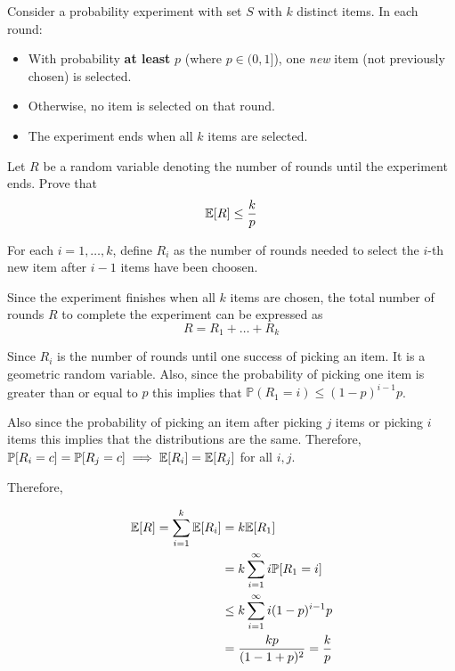 \documentclass[12pt, letterpaper]{article}
\renewcommand{\P}{\mathbb{P}}
\begin{document}
\begin{subproblem}{}
  Consider a probability experiment with set $S$ with $k$ distinct items. In each round: 
  \begin{itemize}
      \item With probability \textbf{at least} $p$ (where $p \in (0,1]$), one \emph{new} item (not previously chosen) is selected. 
      \item Otherwise, no item is selected on that round. 
      \item The experiment ends when all $k$ items are selected. 
  \end{itemize}

  Let $R$ be a random variable denoting the number of rounds until the experiment ends. Prove that
  \[
    \mathbb{E}[R] \leq \frac{k}{p} 
  \]

\end{subproblem}
\begin{problemproof}
  For each $i=1,\dots,k$, define $R_i$ as the number of rounds needed to select the $i$-th new item after $i-1$ items have been choosen.

  Since the experiment finishes when all $k$ items are chosen, the total number of rounds $R$ to complete the experiment can be expressed as
  \[R=R_1+\dots+R_k\]

  Since $R_i$ is the number of rounds until one success of picking an item. It is a geometric random variable. Also, since the probability of picking one item is greater than or equal to $p$ this implies that $\P(R_1=i) \leq (1-p)^{i-1}p$.

  Also since the probability of picking an item after picking $j$ items or picking $i$ items this implies that the distributions are the same. Therefore, $\P[R_i=c]=\P[R_j=c] \implies \E[R_i]=\E[R_j]$ for all $i,j$.

  Therefore,

  \begin{align*}
    \E[R]=\sum_{i=1}^k \E[R_i]&=k\E[R_1]\\
    &=k\sum_{i=1}^\infty i \P[R_1=i]\\
    &\leq k\sum_{i=1}^\infty i(1-p)^{i-1}p\\
    &= \frac{kp}{(1-1+p)^2}=\frac{k}{p}
  \end{align*}
\end{problemproof}
\end{document}

